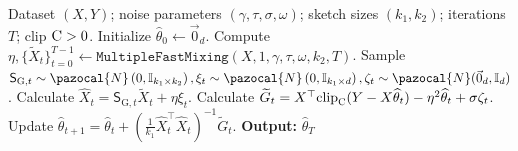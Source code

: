 \documentclass[11pt]{article}
\theoremstyle{definition}
\theoremstyle{plain}
\providecommand{\brI}{\mathbb{I}}
\newcommand{\pN}{\pazocal{N}}
\newcommand{\MultipleFastMixing}{\hyperref[alg:gauss_fast_mix_eta]{\texttt{MultipleFastMixing}}\xspace}
\begin{document}
\begin{algorithm}[!t]
    \caption{Fast IHM} 
    \begin{algorithmic}[1]
        \Require  Dataset $(X, Y)$; noise parameters $(\gamma, \tau, \sigma,\omega)$; sketch sizes $(k_1,k_2)$; iterations $T$; clip $\textsc{C} > 0$.
        \State Initialize $\widehat{\theta}_0 \gets \vec{0}_d$.
        \State Compute $\eta, \big\{\widetilde{X}_{t}\big\}^{T-1}_{t=0} \gets \MultipleFastMixing(X, 1, \gamma, \tau, \omega, k_2, T)$. 
        \algrenewcommand\algorithmicindent{0.75em}            
            \State Sample $\mathsf{S}_{\mathrm{G}, t} \sim \pN\left(0, \brI_{k_1\times k_2}\right), \xi_t \sim \pN\left(0, \brI_{k_1\times d}\right), \zeta_t \sim \pN(\vec{0}_d, \brI_d)$.
            \State Calculate $\widehat{X}_t = \mathsf{S}_{\mathrm{G}, t}\widetilde{X}_t + \eta \xi_t$. \label{line:fast-sketch-X}  
            \State Calculate $\widetilde{G}_t = X^{\top}\mathrm{clip}_{\textsc{C}}(Y - X\widehat{\theta}_t) - \eta^2 \widehat{\theta}_t + \sigma \zeta_t$. \label{line:tildeg-calc}
            \State Update $\widehat{\theta}_{t+1}=\widehat{\theta}_t + (\tfrac{1}{k_1}\widehat{X}_t^{\top}\widehat{X}_t)^{-1}\widetilde{G}_t$.\label{line:update_step} 
        \EndFor 
        \State \textbf{Output:} $\widehat{\theta}_{T}$
    \end{algorithmic}
    \label{alg:private_fast_hessian_sketch}
\end{algorithm}
\end{document}

